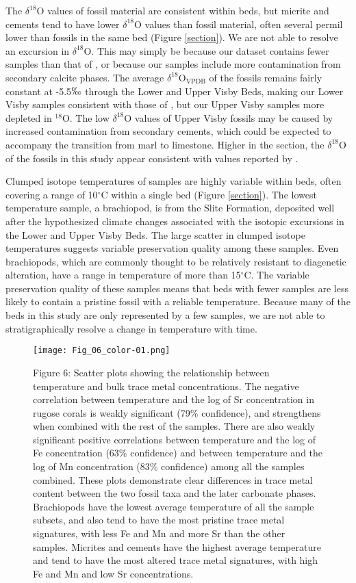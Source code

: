 \documentclass[5p, authoryear]{elsarticle}
\begin{document}
The $\delta^{18}$O values of fossil material are consistent within beds, but micrite and cements tend to have lower $\delta^{18}$O values than fossil material, often several permil lower than fossils in the same bed (Figure \ref{section}). We are not able to resolve an excursion in $\delta^{18}$O. This may simply be because our dataset contains fewer samples than that of \cite{Munnecke2003}, or because our samples include more contamination from secondary calcite phases. The average $\delta^{18}$O$_{\text{VPDB}}$ of the fossils remains fairly constant at -5.5$\permil$ through the Lower and Upper Visby Beds, making our Lower Visby samples consistent with those of \cite{Munnecke2003}, but our Upper Visby samples more depleted in $^{18}$O. The low $\delta^{18}$O values of Upper Visby fossils may be caused by increased contamination from secondary cements, which could be expected to accompany the transition from marl to limestone. Higher in the section, the $\delta^{18}$O of the fossils in this study appear consistent with values reported by \cite{Bickert1997}. 

Clumped isotope temperatures of samples are highly variable within beds, often covering a range of 10$^{\circ}$C within a single bed (Figure \ref{section}). The lowest temperature sample, a brachiopod, is from the Slite Formation, deposited well after the hypothesized climate changes associated with the isotopic excursions in the Lower and Upper Visby Beds. The large scatter in clumped isotope temperatures suggests variable preservation quality among these samples. Even brachiopods, which are commonly thought to be relatively resistant to diagenetic alteration, have a range in temperature of more than 15$^{\circ}$C. The variable preservation quality of these samples means that beds with fewer samples are less likely to contain a pristine fossil with a reliable temperature. Because many of the beds in this study are only represented by a few samples, we are not able to stratigraphically resolve a change in temperature with time. 

\begin{figure*}[b]
\centering
\texttt{[image: Fig\_06\_color-01.png]}
\captionsetup{labelformat=empty} 
\caption{Figure 6: Scatter plots showing the relationship between temperature and bulk trace metal concentrations. The negative correlation between temperature and the log of Sr concentration in rugose corals is weakly significant (79\% confidence), and strengthens when combined with the rest of the samples. There are also weakly significant positive correlations between temperature and the log of Fe concentration (63\% confidence) and between temperature and the log of Mn concentration (83\% confidence) among all the samples combined. These plots demonstrate clear differences in trace metal content between the two fossil taxa and the later carbonate phases. Brachiopods have the lowest average temperature of all the sample subsets, and also tend to have the most pristine trace metal signatures, with less Fe and Mn and more Sr than the other samples. Micrites and cements have the highest average temperature and tend to have the most altered trace metal signatures, with high Fe and Mn and low Sr concentrations.}
\label{Brand}
\end{figure*}
\end{document}
